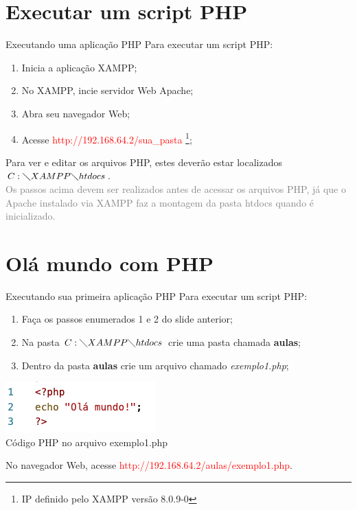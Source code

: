 \documentclass{beamer}
\begin{document}
\section{Executar um script PHP}
\begin{frame}{Executando uma aplicação PHP}
Para executar um script PHP:
\begin{enumerate}
    \item Inicia a aplicação XAMPP;
    \item No XAMPP, incie servidor Web Apache;
    \item Abra seu navegador Web;
    \item Acesse \textcolor{red}{http://192.168.64.2/sua\_pasta} \footnote{IP definido pelo XAMPP versão 8.0.9-0};
\end{enumerate}

Para ver e editar os arquivos PHP, estes deverão estar localizados $C:\diagdown XAMPP\diagdown htdocs$.\\
\vspace{0.5cm}
\textcolor{gray}{Os passos acima devem ser realizados antes de acessar os arquivos PHP, já que o Apache instalado via XAMPP faz a montagem da pasta htdocs quando é inicializado.}

\end{frame}

\section{Olá mundo com PHP}
\begin{frame}{Executando sua primeira aplicação PHP}
Para executar um script PHP:
\begin{enumerate}
    \item Faça os passos enumerados 1 e 2 do slide anterior;
    \item Na pasta $C:\diagdown XAMPP\diagdown htdocs$ crie uma pasta chamada \textbf{aulas}; 
    \item Dentro da pasta \textbf{aulas} crie um arquivo chamado \textit{exemplo1.php};
\end{enumerate}
\begin{center}
    \includegraphics[height=0.2\paperheight]{fig/aula4/php_aula4_2.png}\\
    \tiny{Código PHP no arquivo exemplo1.php}
\end{center}
No navegador Web, acesse \textcolor{red}{http://192.168.64.2/aulas/exemplo1.php}.
\end{frame}
\end{document}

